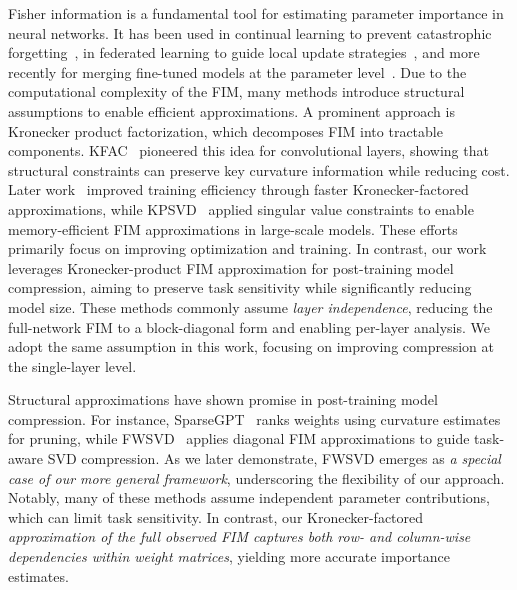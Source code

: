 \documentclass{article}
\begin{document}
Fisher information is a fundamental tool for estimating parameter importance in neural networks. It has been used in continual learning to prevent catastrophic forgetting~\cite{kirkpatrick2017overcoming}, in federated learning to guide local update strategies~\cite{federatedfisher2021}, and more recently for merging fine-tuned models at the parameter level~\cite{fishermerge2024}.
Due to the computational complexity of the FIM, many methods introduce structural assumptions to enable efficient approximations. A prominent approach is Kronecker product factorization, which decomposes FIM into tractable components.
KFAC~\cite{grosse2016kronecker} pioneered this idea for convolutional layers, showing that structural constraints can preserve key curvature information while reducing cost. Later work~\cite{tang2021skfac} improved training efficiency through faster Kronecker-factored approximations, while KPSVD~\cite{koroko2023efficient} applied singular value constraints to enable memory-efficient FIM approximations in large-scale models.
These efforts primarily focus on improving optimization and training. In contrast, our work leverages Kronecker-product FIM approximation for post-training model compression, aiming to preserve task sensitivity while significantly reducing model size.
These methods commonly assume \emph{layer independence}, reducing the full-network FIM to a block-diagonal form and enabling per-layer analysis. We adopt the same assumption in this work, focusing on improving compression at the single-layer level.






Structural approximations have shown promise in post-training model compression. For instance, SparseGPT~\cite{frantar2023sparsegpt} ranks weights using curvature estimates for pruning, while FWSVD~\cite{FWSVD} applies diagonal FIM approximations to guide task-aware SVD compression. As we later demonstrate, FWSVD emerges as \emph{a special case of our more general framework}, underscoring the flexibility of our approach. Notably, many of these methods assume independent parameter contributions, which can limit task sensitivity. In contrast, our Kronecker-factored \emph{approximation of the full observed FIM captures both row- and column-wise dependencies within weight matrices}, yielding more accurate importance estimates.
\end{document}
